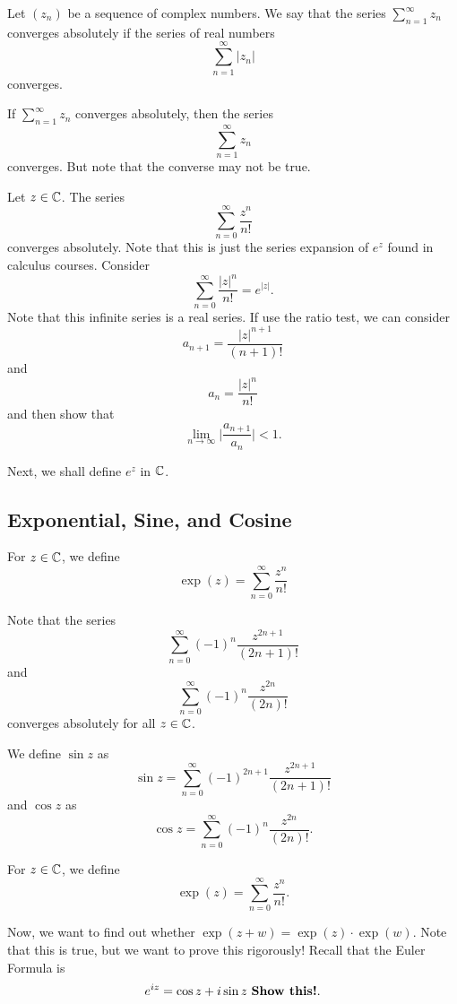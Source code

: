 \documentclass[a4paper]{report}
\begin{document}
\begin{definition}
    Let \( ({z}_{n}) \) be a sequence of complex numbers. We say that the series \( \sum_{  n = 1  }^{  \infty  } {z}_{n} \) converges absolutely if the series of real numbers 
    \[  \sum_{ n=1  }^{ \infty   } | {z}_{n} |  \] converges.
\end{definition}


\begin{remark}
    If \( \sum_{ n=1  }^{ \infty  } {z}_{n} \) converges absolutely, then the series
    \[  \sum_{ n=1  }^{ \infty  } {z}_{n} \] converges.
    But note that the converse may not be true.
\end{remark}

\begin{eg}
Let \( z \in \mathbb{C}  \). The series  
\[  \sum_{ n=0  }^{ \infty  } \frac{ z^{n} }{ n!  }   \]
converges absolutely. Note that this is just the series expansion of \( e^{z} \) found in calculus courses. Consider   
\[  \sum_{ n=0  }^{ \infty  } \frac{ | z |^{n} }{ n!  }  = e^{| z | }.  \]
Note that this infinite series is a real series. If use the ratio test, we can consider 
\[  {a}_{n+1} = \frac{ | z |^{n+1} }{ (n+1)! }  \]
and 
\[  {a}_{n} = \frac{ | z |^{n} }{ n!  }  \]
and then show that 
\[  \lim_{ n \to \infty  }  \Big| \frac{ {a}_{n+1} }{ {a}_{n} }  \Big|  < 1.  \]
\end{eg}

Next, we shall define \( e^{z} \) in \( \mathbb{C}  \). 

\subsection{Exponential, Sine, and Cosine}\label{Exponential, Sine, and Cosine functions}

\begin{definition}
    For \( z \in \mathbb{C}  \), we define 
    \[ \exp(z) = \sum_{ n=0  }^{  \infty  } \frac{ z^{n} }{ n!  }   \]
\end{definition}
Note that the series 
            \[  \sum_{ n=0 }^{ \infty  } (-1)^{n} \frac{ z^{2n+1} }{ (2n+1)!  }  \]
            and 
            \[  \sum_{ n=0  }^{ \infty  } (-1)^{n} \frac{ z^{2n} }{ (2n)! }  \]
            converges absolutely for all \( z \in \mathbb{C}  \).
\begin{definition}
         We define  \( \sin z  \) as
            \[ \sin z = \sum_{ n=0 }^{ \infty  } (-1)^{2n+1} \frac{ z^{2n+1} }{ (2n+1)! } \]
            and \( \cos z  \) as 
            \[  \cos z  =  \sum_{ n = 0  }^{ \infty  } (-1)^{n} \frac{ z^{2n} }{ (2n)! }.  \]
\end{definition}

\begin{definition}[ ]
    For \( z \in \mathbb{C}  \), we define 
    \[  \exp(z) = \sum_{ n=0 }^{ \infty  } \frac{ z^{n} }{ n! }. \]
\end{definition}

Now, we want to find out whether \( \exp(z + w) = \exp(z) \cdot \exp(w) \). Note that this is true, but we want to prove this rigorously! Recall that the Euler Formula is
\[  e^{iz} = \cos z + i \sin z \  \text{\textbf{Show this!}}. \]
\end{document}

